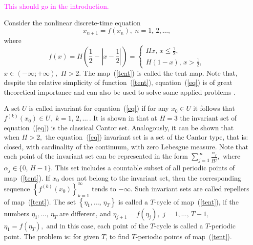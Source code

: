 \documentclass[12pt,a4paper]{amsart}
\begin{document}
\section{}

\textcolor{magenta}{This should go in the introduction.}

Consider the nonlinear discrete-time equation
\begin{equation}\label{eq}
x_{n+1}=f(x_n),\;n=1,\,2,\ldots,
\end{equation}
where 
\begin{equation}\label{tent}
f(x)=H\left(\frac12-\left|x-\frac12\right|\right)=
\left\{\begin{array}{ll}
Hx,\,x\leq\frac12, \\
H(1-x),\,x>\frac12,
\end{array}\right.
\end{equation}
$x\in(-\infty;+\infty),$ $H>2.$ The map~(\ref{tent}) is called the tent map. Note that, despite the relative simplicity of function~(\ref{tent}), 
equation~(\ref{eq}) is of great theoretical importance and can also be used to solve some applied problems \cite{Derr, Goh}.

A set $U$ is called invariant for equation~(\ref{eq}) if for any $x_0\in U$ it follows that $f^{(k)}(x_0)\in U,$ $k=1,\,2,\ldots\,.$ It is shown in \cite{Leonov}
that at $H=3$ the invariant set of equation~(\ref{eq}) is the classical Cantor set. Analogously, it can be shown that when $H>2,$ the equation~(\ref{eq}) 
invariant set is a set of the Cantor type, that is: closed, with cardinality of the continuum, with zero Lebesgue measure. Note that each point of the invariant 
set can be represented in the form $\sum\limits_{j=1}^{\infty}{\frac{\alpha_j}{H^j}},$ where $\alpha_j\in\{0,\,H-1\}.$ This set includes a countable subset 
of all periodic points of map~(\ref{tent}). If $x_0$ does not belong to the invariant set, then the corresponding sequence 
$\left\{f^{(k)}(x_0)\right\}_{k=1}^{\infty}$ tends to $-\infty.$ Such invariant sets are called repellers of map~(\ref{tent}). The set 
$\left\{\eta_1,\ldots,\,\eta_T\right\}$ is called a $T$-cycle of map~(\ref{tent}), if the numbers $\eta_1,\ldots,\,\eta_T$ are different, and 
$\eta_{j+1}=f(\eta_j),$ $j=1,\ldots,\,T-1,$ $\eta_1=f(\eta_T),$ and in this case, each point of the $T$-cycle is called a $T$-periodic point. The problem is: 
for given $T$, to find $T$-periodic points of map~(\ref{tent}).



\end{document}
